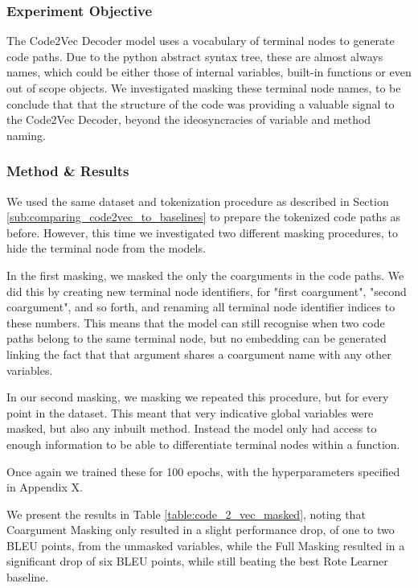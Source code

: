 \subsubsection{Experiment Objective} %

The Code2Vec Decoder model uses a vocabulary of terminal nodes to generate code paths. 
Due to the python abstract syntax tree, these are almost always names, which could be either those of internal variables, built-in functions or even out of scope objects. 
We investigated masking these terminal node names, to be conclude that that the structure of the code was providing a valuable signal to the Code2Vec Decoder, beyond the ideosyncracies of variable and method naming.

\subsubsection{Method \& Results} %

We used the same dataset and tokenization procedure as described in Section \ref{sub:comparing_code2vec_to_baselines} to prepare the tokenized code paths as before.
However, this time we investigated two different masking procedures, to hide the terminal node from the models.

In the first masking, we masked the only the coarguments in the code paths.
We did this by creating new terminal node identifiers, for "first coargument", "second coargument", and so forth, and renaming all terminal node identifier indices to these numbers.
This means that the model can still recognise when two code paths belong to the same terminal node, but no embedding can be generated linking the fact that that argument shares a coargument name with any other variables.

In our second masking, we masking we repeated this procedure, but for every point in the dataset.
This meant that very indicative global variables were masked, but also any inbuilt method.
Instead the model only had access to enough information to be able to differentiate terminal nodes within a function.

Once again we trained these for 100 epochs, with the hyperparameters specified in Appendix X.

We present the results in Table \ref{table:code_2_vec_masked}, noting that Coargument Masking only resulted in a slight performance drop, of one to two BLEU points, from the unmasked variables, while the Full Masking resulted in a significant drop of six BLEU points, while still beating the best Rote Learner baseline.



